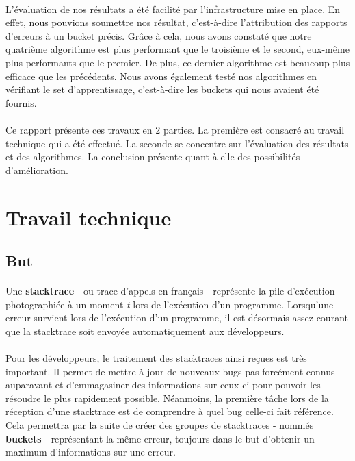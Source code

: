 \documentclass{article}
\begin{document}
\paragraph{}
L’évaluation de nos résultats a été facilité par l’infrastructure mise en place. En effet, nous pouvions soumettre nos résultat, c’est-à-dire l’attribution des rapports d’erreurs à un bucket précis. Grâce à cela, nous avons constaté que notre quatrième algorithme est plus performant que le troisième et le second, eux-même plus performants que le premier. De plus, ce dernier algorithme est beaucoup plus efficace que les précédents. Nous avons également testé nos algorithmes en vérifiant le set d'apprentissage, c'est-à-dire les buckets qui nous avaient été fournis.

\paragraph{}
Ce rapport présente ces travaux en 2 parties. La première est consacré au travail technique qui a été effectué. La seconde se concentre sur l'évaluation des résultats et des algorithmes. La conclusion présente quant à elle des possibilités d'amélioration.

\newpage

\section{Travail technique}

\subsection{But}

\paragraph{}
Une \textbf{stacktrace} - ou trace d'appels en français - représente la pile d'exécution photographiée à un moment \textit{t} lors de l'exécution d'un programme. Lorsqu'une erreur survient lors de l'exécution d'un programme, il est désormais assez courant que la stacktrace soit envoyée automatiquement aux développeurs.

\paragraph{}
Pour les développeurs, le traitement des stacktraces ainsi reçues est très important. Il permet de mettre à jour de nouveaux bugs pas forcément connus auparavant et d'emmagasiner des informations sur ceux-ci pour pouvoir les résoudre le plus rapidement possible. Néanmoins, la première tâche lors de la réception d'une stacktrace est de comprendre à quel bug celle-ci fait référence. Cela permettra par la suite de créer des groupes de stacktraces - nommés \textbf{buckets} - représentant la même erreur, toujours dans le but d'obtenir un maximum d'informations sur une erreur.
\end{document}
